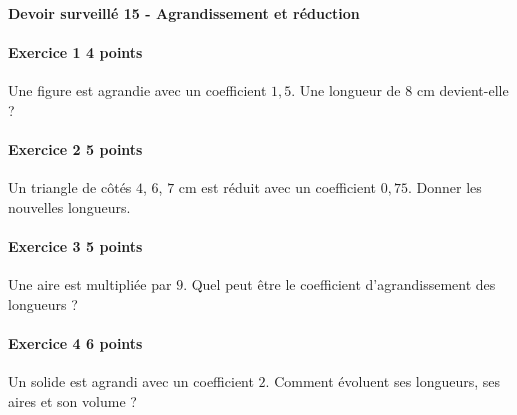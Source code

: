 \documentclass[a4paper,10pt]{article}
\newenvironment{exercice}[2]{\paragraph{Exercice #1 \hfill #2 points}\mbox{}\par}{\medskip}
\begin{document}
\begin{center}\Large\bfseries Devoir surveillé 15 - Agrandissement et réduction\end{center}
\vspace{2mm}
\begin{exercice}{1}{4}Une figure est agrandie avec un coefficient $1,5$. Une longueur de $8$ cm devient-elle ?\end{exercice}\begin{exercice}{2}{5}Un triangle de côtés $4$, $6$, $7$ cm est réduit avec un coefficient $0,75$. Donner les nouvelles longueurs.\end{exercice}\begin{exercice}{3}{5}Une aire est multipliée par $9$. Quel peut être le coefficient d'agrandissement des longueurs ?\end{exercice}\begin{exercice}{4}{6}Un solide est agrandi avec un coefficient $2$. Comment évoluent ses longueurs, ses aires et son volume ?\end{exercice}
\end{document}
